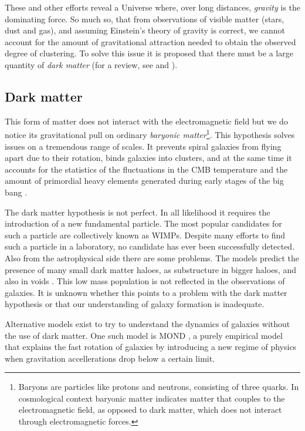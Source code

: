 These and other efforts reveal a Universe where, over long distances, \emph{gravity} is the dominating force.  So much so, that from observations of visible matter (stars, dust and gas), and assuming Einstein's theory of gravity is correct, we cannot account for the amount of gravitational attraction needed to obtain the observed degree of clustering. To solve this issue it is proposed that there must be a large quantity of \emph{dark matter} (for a review, see \citet{Trimble1987} and \citet{Sanders2010}).


\subsection{Dark matter}
This form of matter does not interact with the electromagnetic field but we do notice its gravitational pull on ordinary \emph{baryonic matter}\footnote{Baryons are particles like protons and neutrons, consisting of three quarks. In cosmological context baryonic matter indicates matter that couples to the electromagnetic field, as opposed to dark matter, which does not interact through electromagnetic forces.}. This hypothesis solves issues on a tremendous range of scales. It prevents spiral galaxies from flying apart due to their rotation, binds galaxies into clusters, and at the same time it accounts for the statistics of the fluctuations in the \ac{CMB} temperature and the amount of primordial heavy elements generated during early stages of the big bang \citep{Schramm1998, Olive2000}.

The dark matter hypothesis is not perfect. In all likelihood it requires the introduction of a new fundamental particle. The most popular candidates for such a particle are collectively known as \ac{WIMPs}. Despite many efforts to find such a particle in a laboratory, no candidate has ever been successfully detected. Also from the astrophysical side there are some problems.
The models predict the presence of many small dark matter haloes, as substructure in bigger haloes, and also in voids \citep{Peebles2001}. This low mass population is not reflected in the observations of galaxies. It is unknown whether this points to a problem with the dark matter hypothesis or that our understanding of galaxy formation is inadequate.

Alternative models exist to try to understand the dynamics of galaxies without the use of dark matter. One such model is \ac{MOND} \citep{Milgrom1983,Sanders2002}, a purely empirical model that explains the fast rotation of galaxies by introducing a new regime of physics when gravitation accellerations drop below a certain limit.

